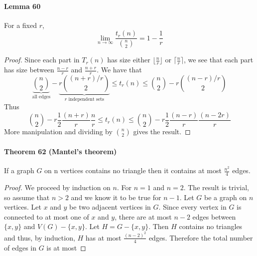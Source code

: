 \paragraph{Lemma 60} For a fixed $ r $, 
$$ \lim_{n\to\infty} \frac{t_r(n)}{\binom{n}{2}} = 1 - \frac{1}{r}$$
\begin{proof}
    Since each part in $ T_r(n) $ has size either $\lfloor\frac{n}{r}\rfloor$
    or $\lceil\frac{n}{r}\rceil$, we see that each part has size between
    $ \frac{n-r}{r}$ and $ \frac{n+r}{r}$. We have that 
    $$ \underbrace{\binom{n}{2}}_{\text{all edges}} - 
    \underbrace{r \binom{(n+r)/r}{2}}_{r \text{ independent sets}} 
    \leq t_r(n) \leq \binom{n}{2} - r\binom{(n-r)/r}{2} $$
    Thus 
    $$ \binom{n}{2} - r \frac{1}{2}\frac{(n+r)}{r}\frac{n}{r}
    \leq t_r(n) \leq \binom{n}{2} - r \frac{1}{2}\frac{(n-r)}{r}\frac{(n-2r)}{r} 
    $$
    More manipulation and dividing by $ \binom{n}{2} $ gives the result.
\end{proof}

\paragraph{Theorem 62 (Mantel's theorem)} If a graph $G$ on n vertices contains 
no triangle then it contains at most $ \frac{n^2}{4} $ edges.
\begin{proof} 
    We proceed by induction on $ n $. For $ n = 1 $ and $ n = 2$. The result 
    is trivial, so assume that $ n > 2 $ and we know it to be true for $n - 1$.
    Let $G$ be a graph on $n$ vertices. Let $x$ and $y$ be two adjacent vertices
    in $G$. Since every vertex in $G$ is connected to at most one of $x$ and
    $y$, there are at most $ n - 2 $ edges between $ \{x,y\} $ and $ V(G) 
    - \{x,y\}$. Let $ H = G - \{x,y\}$. Then $ H $ contains no triangles 
    and thus, by induction, $ H $ has at most $ \frac{(n - 2)^2}{4} $ edges. 
    Therefore the total number of edges in $ G $ is at most
\end{proof}

